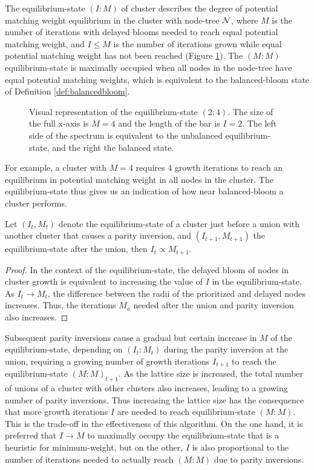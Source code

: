 \begin{definition}\label{def:eqstate}
  The equilibrium-state $(I:M)$ of cluster describes the degree of potential matching weight equilibrium in the cluster with node-tree $\mathcal{N}$, where $M$ is the number of iterations with delayed blooms needed to reach equal potential matching weight, and $I\leq M$ is the number of iterations grown while equal potential matching weight has not been reached (Figure \ref{fig:eqstate}). The $(M:M)$ equilibrium-state is maximally occupied when all nodes in the node-tree have equal potential matching weights, which is equivalent to the balanced-bloom state of Definition \ref{def:balancedbloom}. 
\end{definition}
\begin{figure}
  \centering
  \caption{Visual representation of the equilibrium-state $(2:4)$. The size of the full x-axis is $M=4$ and the length of the bar is $I=2$. The left side of the spectrum is equivalent to the unbalanced equilibrium-state, and the right the balanced state.}\label{fig:eqstate}
\end{figure}
For example, a cluster with $M=4$ requires 4 growth iterations to reach an equilibrium in potential matching weight in all nodes in the cluster. The equilibrium-state thus gives us an indication of how near balanced-bloom a cluster performs. 
\begin{lemma}\label{lem:eqstate}
  Let $(I_t, M_t)$ denote the equilibrium-state of a cluster just before a union with another cluster that causes a parity inversion, and $(I_{t+1}, M_{t+1})$ the equilibrium-state after the union, then $I_t \propto M_{t+1}$.
\end{lemma}
\begin{proof}
  In the context of the equilibrium-state, the delayed bloom of nodes in cluster growth is equivalent to increasing the value of $I$ in the equilibrium-state. As $I_t\to M_t$, the difference between the radii of the prioritized and delayed nodes increases. Thus, the iterations $M_a$ needed after the union and parity inversion also increases. 
\end{proof}
Subsequent parity inversions cause a gradual but certain increase in $M$ of the equilibrium-state, depending on $(I_t:M_t)$ during the parity inversion at the union, requiring a growing number of growth iterations $I_{t+1}$ to reach the equilibrium-state $(M:M)_{t+1}$. As the lattice size is increased, the total number of unions of a cluster with other clusters also increases, leading to a growing number of parity inversions. Thus increasing the lattice size has the consequence that more growth iterations $I$ are needed to reach equilibrium-state $(M:M)$. This is the trade-off in the effectiveness of this algorithm. On the one hand, it is preferred that $I\to M$ to maximally occupy the equilibrium-state that is a heuristic for minimum-weight, but on the other, $I$ is also proportional to the number of iterations needed to actually reach $(M:M)$ due to parity inversions. 

